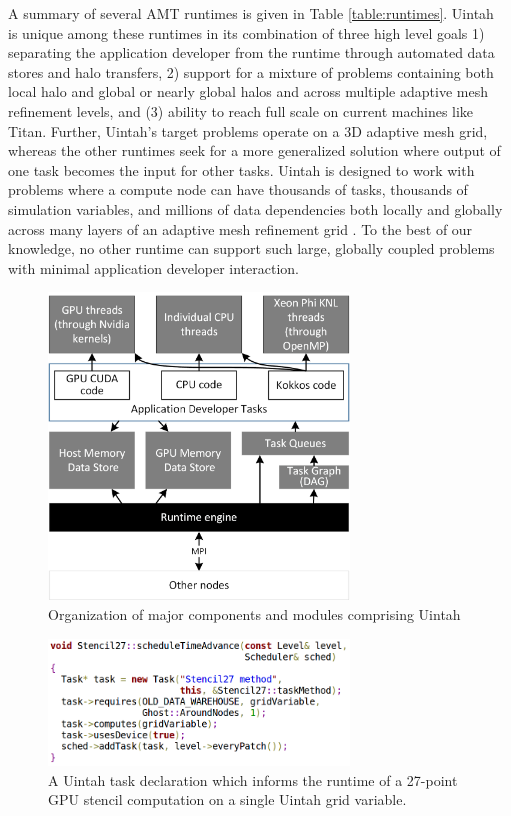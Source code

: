 \documentclass[12pt]{article}
\begin{document}
A summary of several AMT runtimes is given in Table \ref{table:runtimes}.   Uintah ~\cite{MB-UUSCI-2012-001,wolfhpc12}  is unique among these runtimes in its combination of three high level goals 1) separating the application developer from the runtime through automated data stores and halo transfers, 2) support for a mixture of problems containing both local halo and global or nearly global halos and across multiple adaptive mesh refinement levels, and (3) ability to reach full scale on current machines like Titan.  Further, Uintah's target problems operate on a 3D adaptive mesh grid, whereas the other runtimes seek for a more generalized solution where output of one task becomes the input for other tasks.  Uintah is designed to work with problems where a compute node can have thousands of tasks, thousands of simulation variables, and millions of data dependencies both locally and globally across many layers of an adaptive mesh refinement grid \cite{espm2-brad}.  To the best of our knowledge, no other runtime can support such large, globally coupled problems with minimal application developer interaction.  
\begin{figure}
	\centering
	\includegraphics[width=8cm]{figures/Uintah_modules_simplified.png}
	\caption{Organization of major components and modules comprising Uintah}
	\label{fig:uintah-structure}
\end{figure}
 
\begin{figure}
	\centering
	\includegraphics[width=8cm]{figures/stencil27-task.png}
	\caption{A Uintah task declaration which informs the runtime of a 27-point GPU stencil computation on a single Uintah grid variable.}
	\label{fig:stencil27-task}
\end{figure}
\end{document}
